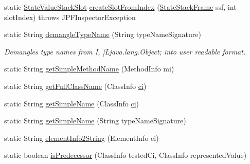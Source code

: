 \begin{DoxyCompactItemize}
\item 
static \hyperlink{classgov_1_1nasa_1_1jpf_1_1inspector_1_1server_1_1programstate_1_1_state_value_stack_slot}{State\+Value\+Stack\+Slot} \hyperlink{classgov_1_1nasa_1_1jpf_1_1inspector_1_1server_1_1programstate_1_1_state_value_stack_slot_a2fc89085abd1dd4464f18cbb2a79d997}{create\+Slot\+From\+Index} (\hyperlink{classgov_1_1nasa_1_1jpf_1_1inspector_1_1server_1_1programstate_1_1_state_stack_frame}{State\+Stack\+Frame} ssf, int slot\+Index)  throws J\+P\+F\+Inspector\+Exception 
\item 
static String \hyperlink{classgov_1_1nasa_1_1jpf_1_1inspector_1_1server_1_1programstate_1_1_state_value_a4b2af88402e04430a98ebadbd98a5c67}{demangle\+Type\+Name} (String type\+Name\+Signature)
\begin{DoxyCompactList}\small\item\em Demangles type names from I, \mbox{[}Ljava.\+lang.\+Object; into user readable format. \end{DoxyCompactList}\item 
static String \hyperlink{classgov_1_1nasa_1_1jpf_1_1inspector_1_1server_1_1programstate_1_1_state_value_a7d810b593e21df3baabf5b13e473b152}{get\+Simple\+Method\+Name} (Method\+Info mi)
\item 
static String \hyperlink{classgov_1_1nasa_1_1jpf_1_1inspector_1_1server_1_1programstate_1_1_state_value_ab6efcb01d11093b4d9de33a220d0f204}{get\+Full\+Class\+Name} (Class\+Info \hyperlink{classgov_1_1nasa_1_1jpf_1_1inspector_1_1server_1_1programstate_1_1_state_value_a0eb4aa1e630ed6372dcfb8c41ae7edc5}{ci})
\item 
static String \hyperlink{classgov_1_1nasa_1_1jpf_1_1inspector_1_1server_1_1programstate_1_1_state_value_ad0fa5ab42fdeea38ce4fec44451ef680}{get\+Simple\+Name} (Class\+Info \hyperlink{classgov_1_1nasa_1_1jpf_1_1inspector_1_1server_1_1programstate_1_1_state_value_a0eb4aa1e630ed6372dcfb8c41ae7edc5}{ci})
\item 
static String \hyperlink{classgov_1_1nasa_1_1jpf_1_1inspector_1_1server_1_1programstate_1_1_state_value_a160cb94910e40bb87a81018116c92c09}{get\+Simple\+Name} (String type\+Name\+Signature)
\item 
static String \hyperlink{classgov_1_1nasa_1_1jpf_1_1inspector_1_1server_1_1programstate_1_1_state_value_aea337730b417cd995d983e1cbcff744e}{element\+Info2\+String} (Element\+Info ei)
\item 
static boolean \hyperlink{classgov_1_1nasa_1_1jpf_1_1inspector_1_1server_1_1programstate_1_1_state_value_aa23de04378976833758e7303f3d4cee6}{is\+Predecessor} (Class\+Info tested\+Ci, Class\+Info represented\+Value)

\end{DoxyCompactItemize}
